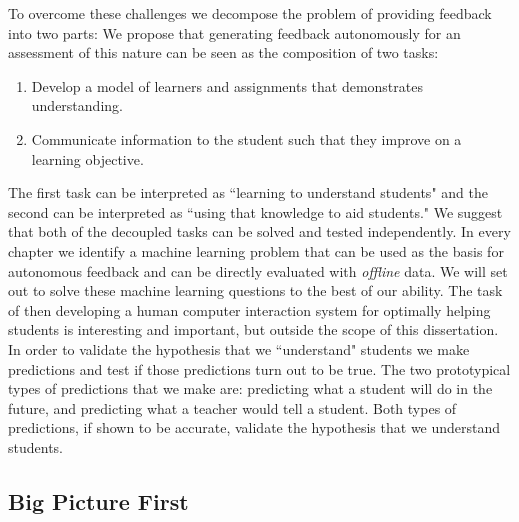 To overcome these challenges we decompose the problem of providing feedback into two parts:
We propose that generating feedback autonomously for an assessment of this nature can be seen as the composition of two tasks: 
\begin{enumerate}
\item Develop a model of learners and assignments that demonstrates understanding. 
\item Communicate information to the student such that they improve on a learning objective. 
\end{enumerate}
The first task can be interpreted as ``learning to understand students" and the second can be interpreted as ``using that knowledge to aid students." We suggest that both of the decoupled tasks can be solved and tested independently. In every chapter we identify a machine learning problem that can be used as the basis for autonomous feedback and can be directly evaluated with \emph{offline} data. We will set out to solve these machine learning questions to the best of our ability. The task of then developing a human computer interaction system for optimally helping students is interesting and important, but outside the scope of this dissertation. In order to validate the hypothesis that we ``understand" students we make predictions and test if those predictions turn out to be true. The two prototypical types of predictions that we make are:  predicting what a student will do in the future, and predicting what a teacher would tell a student. Both types of predictions, if shown to be accurate, validate the hypothesis that we understand students.

\subsection{Big Picture First}

